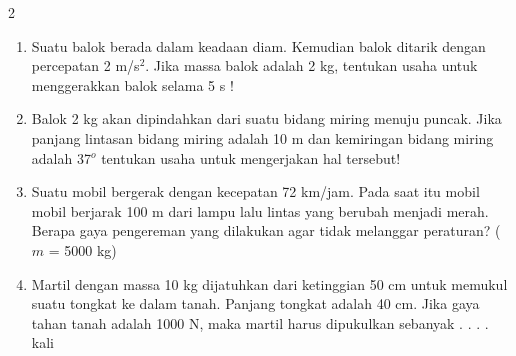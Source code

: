 \documentclass[10pt,a4paper]{article}
\begin{document}
\begin{multicols*} {2}
\begin{enumerate}
    \item Suatu balok berada dalam keadaan diam. Kemudian balok ditarik dengan percepatan 2 m/s$^2$. Jika massa balok adalah 2 kg, tentukan usaha untuk menggerakkan balok selama 5 s !
    \vspace {3cm}

    \item Balok 2 kg akan dipindahkan dari suatu bidang miring menuju puncak. Jika panjang lintasan bidang miring adalah 10 m dan kemiringan bidang miring adalah 37$^o$ tentukan usaha untuk mengerjakan hal tersebut!
    \vspace {4cm}


    \item  Suatu mobil bergerak dengan kecepatan 72 km/jam. Pada saat itu mobil mobil berjarak 100 m dari lampu lalu lintas yang berubah menjadi merah. Berapa gaya pengereman yang dilakukan agar tidak melanggar peraturan? ($m$ = 5000 kg)
    \vspace {3cm}


    \item Martil dengan massa 10 kg dijatuhkan dari ketinggian 50 cm untuk memukul suatu tongkat ke dalam tanah. Panjang tongkat adalah 40 cm. Jika gaya tahan tanah adalah 1000 N, maka martil harus dipukulkan sebanyak . . . . kali

\end{enumerate}

\end{multicols*}


 
\end{document}
